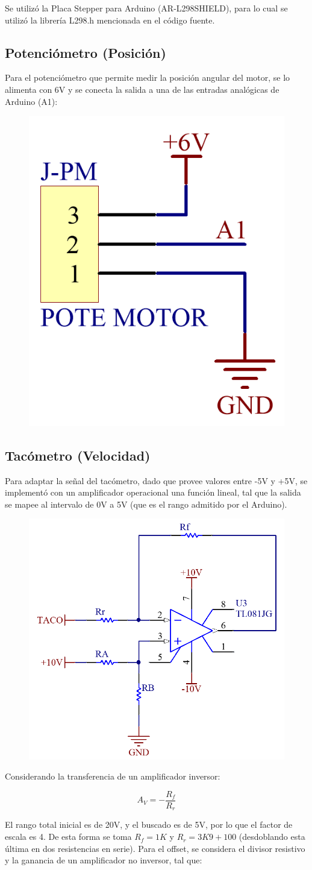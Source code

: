 \documentclass{article}
\begin{document}
Se utilizó la Placa Stepper para Arduino (AR-L298SHIELD), para lo cual se utilizó la librería L298.h mencionada en el código fuente.

\subsection{Potenciómetro (Posición)}

Para el potenciómetro que permite medir la posición angular del motor, se lo alimenta con 6V y se conecta la salida a una de las entradas analógicas de Arduino (A1):

\begin{figure}[H]
\centering
\includegraphics[width=0.15\linewidth]{../Images/PoteMotor.png}
\end{figure}

\subsection{Tacómetro (Velocidad)}
Para adaptar la señal del tacómetro, dado que provee valores entre -5V y +5V, se implementó con un amplificador operacional una función lineal, tal que la salida se mapee al intervalo de 0V a 5V (que es el rango admitido por el Arduino).\par

\begin{figure}[H]
\centering
\includegraphics[width=0.4\linewidth]{../Images/ModeloFuncion.png}
\end{figure}

Considerando la transferencia de un amplificador inversor:

\[
A_V = - \frac{R_f}{R_r}
\]

El rango total inicial es de 20V, y el buscado es de 5V, por lo que el factor de escala es 4. De esta forma se toma $R_f = 1K$ y $R_r = 3K9 + 100$ (desdoblando esta última en dos resistencias en serie). Para el offset, se considera el divisor resistivo y la ganancia de un amplificador no inversor, tal que:
\end{document}
